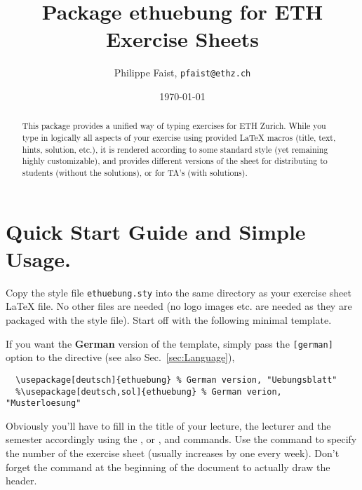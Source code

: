\documentclass[11pt,a4paper]{article}
\title{Package {\fontseries{m}\selectfont ethuebung} for ETH Exercise Sheets}
\author{Philippe Faist, \texttt{pfaist@ethz.ch}}
\date\today
\begin{document}
\maketitle

\renewcommand{\abstractname}{}
\setlength{\noteabstracttextwidth}{0.95\textwidth}
\renewcommand{\noteabstracttextfont}{\small}
\begin{abstract}
This package provides a unified way of typing exercises for ETH Zurich. While you type in
logically all aspects of your exercise using provided \LaTeX{} macros (title, text, hints,
solution, etc.), it is rendered according to some standard style (yet remaining highly
customizable), and provides different versions of the sheet for distributing to students
(without the solutions), or for TA's (with solutions).
\end{abstract}

\inlinetoc

\section{Quick Start Guide and Simple Usage.}
\label{sec:quickstart}

Copy the style file \texttt{ethuebung.sty} into the same directory as your exercise sheet
\LaTeX{} file. No other files are needed (no logo images etc. are needed as they are
packaged with the style file). Start off with the following minimal template.

\begin{pkgverbatim}%
%
\end{pkgverbatim}

If you want the {\bfseries German} version of the template, simply pass the
\texttt{[german]} option to the  directive (see also
Sec.~\ref{sec:Language}),
\begin{pkgverbatim}
\begin{verbatim}
  \usepackage[deutsch]{ethuebung} % German version, "Uebungsblatt"
  %\usepackage[deutsch,sol]{ethuebung} % German verion, "Musterloesung"
\end{verbatim}
\end{pkgverbatim}

Obviously you'll have to fill in the title of your lecture, the lecturer and the semester
accordingly using the ,  or
, and  commands. Use the
 command to specify the number of the exercise sheet (usually
increases by one every week). Don't forget the  command at the
beginning of the document to actually draw the header.
\end{document}
